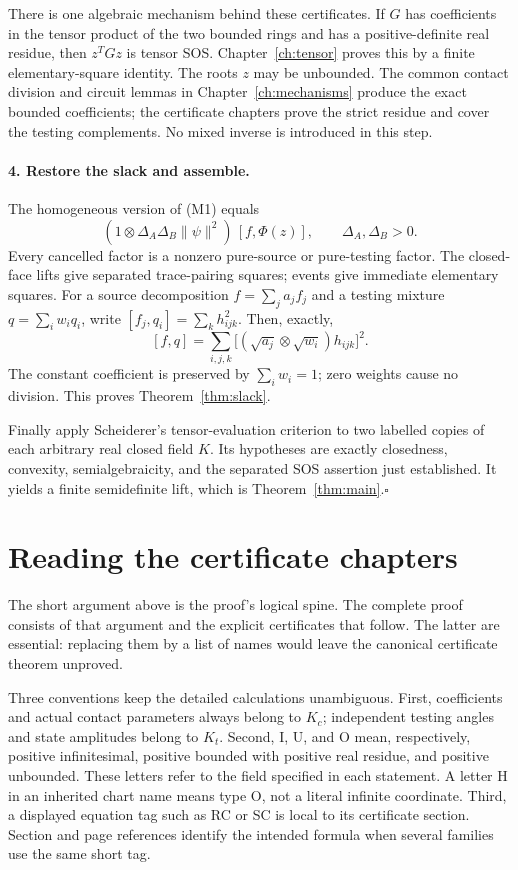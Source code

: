 There is one algebraic mechanism behind these certificates.  If
$G$ has coefficients in the tensor product of the two bounded rings
and has a positive-definite real residue, then $z^TGz$ is tensor SOS.
Chapter~\ref{ch:tensor} proves this by a finite elementary-square
identity.  The roots $z$ may be unbounded.  The common contact
division and circuit lemmas in Chapter~\ref{ch:mechanisms} produce
the exact bounded coefficients; the certificate chapters prove the
strict residue and cover the testing complements.  No mixed inverse
is introduced in this step.

\paragraph{4. Restore the slack and assemble.}
The homogeneous version of (M1) equals
\[
 (1\otimes\Delta_A\Delta_B\|\psi\|^2)\,[f,\Phi(z)],
 \qquad \Delta_A,\Delta_B>0.
\]
Every cancelled factor is a nonzero pure-source or pure-testing
factor.  The closed-face lifts give separated trace-pairing squares;
events give immediate elementary squares.  For a source decomposition
$f=\sum_j a_j f_j$ and a testing mixture $q=\sum_iw_iq_i$, write
$[f_j,q_i]=\sum_k h_{ijk}^2$.  Then, exactly,
\[
 [f,q]=\sum_{i,j,k}
       \bigl[(\sqrt{a_j}\otimes\sqrt{w_i})h_{ijk}\bigr]^2.
                                                               \tag{M2}
\]
The constant coefficient is preserved by $\sum_iw_i=1$; zero
weights cause no division.  This proves Theorem~\ref{thm:slack}.

Finally apply Scheiderer's tensor-evaluation criterion
\cite[Corollary 3.19]{scheiderer} to two labelled copies of each
arbitrary real closed field $K$.  Its hypotheses are exactly
closedness, convexity, semialgebraicity, and the separated SOS
assertion just established.  It yields a finite semidefinite lift,
which is Theorem~\ref{thm:main}.\hfill$\square$

\section{Reading the certificate chapters}

The short argument above is the proof's logical spine.  The complete
proof consists of that argument and the explicit certificates that
follow.  The latter are essential: replacing them by a list of names
would leave the canonical certificate theorem unproved.

Three conventions keep the detailed calculations unambiguous.
First, coefficients and actual contact parameters always belong to
$K_c$; independent testing angles and state amplitudes belong to
$K_t$.  Second, $\mathrm I$, $\mathrm U$, and $\mathrm O$ mean,
respectively, positive infinitesimal, positive bounded with positive
real residue, and positive unbounded.  These letters refer to the
field specified in each statement.  A letter H in an inherited chart
name means type $\mathrm O$, not a literal infinite coordinate.
Third, a displayed equation tag such as RC or SC is local to its
certificate section.  Section and page references identify the
intended formula when several families use the same short tag.

